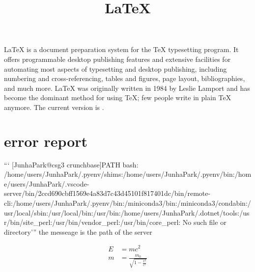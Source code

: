 \documentclass[12pt]{article}
\title{\LaTeX}
\date{}
\begin{document}
  \maketitle
  \LaTeX{} is a document preparation system for the \TeX{}
  typesetting program. It offers programmable desktop publishing
  features and extensive facilities for automating most aspects of
  typesetting and desktop publishing, including numbering and
  cross-referencing, tables and figures, page layout, bibliographies,
  and much more. \LaTeX{} was originally written in 1984 by Leslie
  Lamport and has become the dominant method for using \TeX; few
  people write in plain \TeX{} anymore. The current version  is
  \LaTeXe.

  \section*{error report }

```
[JunhaPark@csg3 crunchbase]$ $PATH
bash: /home/users/JunhaPark/.pyenv/shims:/home/users/JunhaPark/.pyenv/bin:/home/users/JunhaPark/.vscode-server/bin/2ccd690cbff1569e4a83d7c43d45101f817401dc/bin/remote-cli:/home/users/JunhaPark/.pyenv/bin:/miniconda3/bin:/miniconda3/condabin:/usr/local/sbin:/usr/local/bin:/usr/bin:/home/users/JunhaPark/.dotnet/tools:/usr/bin/site_perl:/usr/bin/vendor_perl:/usr/bin/core_perl: No such file or directory'''
 the messeage is the path of the server

  \begin{align}
    E &= mc^2                              \\
    m &= \frac{m_0}{\sqrt{1-\frac{v^2}{c^2}}}
  \end{align}
\end{document}
